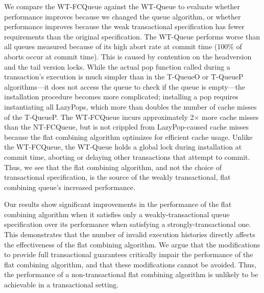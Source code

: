 We compare the WT-FCQueue against the WT-Queue to evaluate whether performance improves because we changed the queue algorithm, or whether performance improves because the weak transactional specification has fewer requirements than the original specification. The WT-Queue performs worse than all queues measured because of its high abort rate at commit time (100\% of aborts occur at commit time). This is caused by contention on the headversion and the tail version locks. While the actual pop function called during a transaction's execution is much simpler than in the T-QueueO or T-QueueP algorithms---it does not access the queue to check if the queue is empty---the installation procedure becomes more complicated; installing a pop requires instantiating all LazyPops, which more than doubles the number of cache misses of the T-QueueP. The WT-FCQueue incurs approximately 2$\times$ more cache misses than the NT-FCQueue, but is not crippled from LazyPop-caused cache misses because the flat combining algorithm optimizes for efficient cache usage. Unlike the WT-FCQueue, the WT-Queue holds a global lock during installation at commit time, aborting or delaying other transactions that attempt to commit. Thus, we see that the flat combining algorithm, and not the choice of transactional specification, is the source of the weakly transactional, flat combining queue's increased performance.

Our results show significant improvements in the performance of the flat combining algorithm when it satisfies only a weakly-transactional queue specification over its performance when satisfying a strongly-transactional one. This demonstrates that the number of invalid execution histories directly affects the effectiveness of the flat combining algorithm. We argue that the modifications to provide full transactional guarantees critically impair the performance of the flat combining algorithm, and that these modifications cannot be avoided. Thus, the performance of a non-transactional flat combining algorithm is unlikely to be achievable in a transactional setting.
